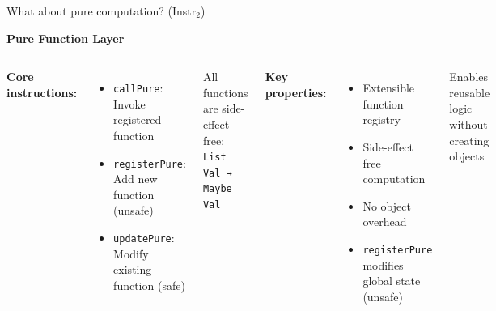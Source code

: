 \documentclass[handout,aspectratio=169,xcolor=dvipsnames,10pt]{beamer}
\begin{document}

\begin{frame}{What about pure computation? (Instr$_2$)}

\vfill

\textbf{Pure Function Layer}

\vspace{0.5em}

\begin{columns}[T]

\textbf{Core instructions:}

\begin{itemize}
  \item \texttt{callPure}: Invoke registered function
  \item \texttt{registerPure}: Add new function (unsafe)
  \item \texttt{updatePure}: Modify existing function (safe)
\end{itemize}

\vspace{0.5em}

{\small All functions are side-effect free: \texttt{List Val → Maybe Val}}


\textbf{Key properties:}

\begin{itemize}\small
  \item Extensible function registry
  \item Side-effect free computation
  \item No object overhead
  \item \texttt{registerPure} modifies global state (unsafe)
\end{itemize}

\vspace{0.5em}

{\footnotesize Enables reusable logic without creating objects}

\end{columns}

\vfill

\end{frame}

\end{document}

